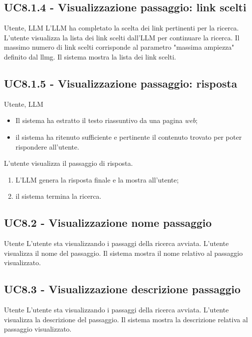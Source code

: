 \subsection{UC8.1.4 - Visualizzazione passaggio: link scelti}
\label{8.1.4}
\makeUC{}
{Utente, LLM}
{L'LLM ha completato la scelta dei link pertinenti per la ricerca.}
{L'utente visualizza la lista dei link scelti dall'LLM per continuare la ricerca.
Il massimo numero di link scelti corrisponde al parametro "massima ampiezza" 
definito dal \gls{llmg}.}
{Il sistema mostra la lista dei link scelti.}{}{}{}{}

\subsection{UC8.1.5 - Visualizzazione passaggio: risposta}
\label{8.1.5}
\makeUC{}
{Utente, LLM}
{
    \begin{itemize}
        \item Il sistema ha estratto il testo riassuntivo da una pagina \textit{web};
        \item il sistema ha ritenuto sufficiente e pertinente il contenuto trovato per poter rispondere all'utente.
    \end{itemize}
}
{L'utente visualizza il passaggio di risposta.}
{
    \begin{enumerate}
        \item L'LLM genera la risposta finale e la mostra all'utente;
        \item il sistema termina la ricerca.
    \end{enumerate}
}{}{}{}{}

\subsection{UC8.2 - Visualizzazione nome passaggio}
\label{8.2}
\makeUC{}
{Utente}
{L'utente sta visualizzando i passaggi della ricerca avviata.}
{L'utente visualizza il nome del passaggio.}
{Il sistema mostra il nome relativo al passaggio visualizzato.}{}{}{}{}

\subsection{UC8.3 - Visualizzazione descrizione passaggio}
\label{8.3}
\makeUC{}
{Utente}
{L'utente sta visualizzando i passaggi della ricerca avviata.}
{L'utente visualizza la descrizione del passaggio.}
{Il sistema mostra la descrizione relativa al passaggio visualizzato.}{}{}{}{}

